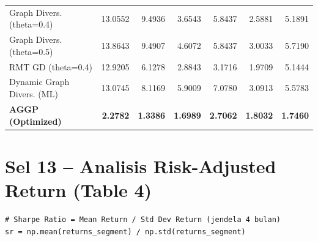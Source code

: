 \documentclass[12pt,a4paper]{article}
\begin{document}
\begin{table}[h!]
\begin{tabular}{lrrrrrr}
        Graph Divers. (theta=0.4)   & 13.0552 & 9.4936 & 3.6543 & 5.8437 & 2.5881 & 5.1891 \\
        Graph Divers. (theta=0.5)   & 13.8643 & 9.4907 & 4.6072 & 5.8437 & 3.0033 & 5.7190 \\
        RMT GD (theta=0.4)          & 12.9205 & 6.1278 & 2.8843 & 3.1716 & 1.9709 & 5.1444 \\
        Dynamic Graph Divers. (ML)  & 13.0745 & 8.1169 & 5.9009 & 7.0780 & 3.0913 & 5.5783 \\
        \textbf{AGGP (Optimized)}   & \textbf{2.2782}  & \textbf{1.3386}  & \textbf{1.6989}  & \textbf{2.7062}  & \textbf{1.8032}  & \textbf{1.7460}  \\
        \bottomrule
    \end{tabular}
\end{table}

\section{Sel 13 -- Analisis Risk-Adjusted Return (Table 4)}

\begin{lstlisting}[caption={Kalkulasi Sharpe Ratio Periodik}]
# Sharpe Ratio = Mean Return / Std Dev Return (jendela 4 bulan)
sr = np.mean(returns_segment) / np.std(returns_segment)
\end{lstlisting}
\end{document}
